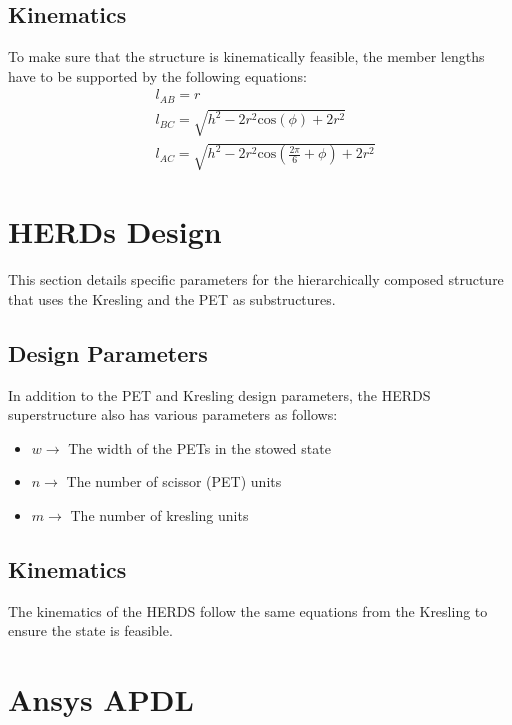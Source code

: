 \documentclass[11pt, a4paper]{article}
\begin{document}
\subsection{Kinematics}
To make sure that the structure is kinematically feasible, the member lengths have to be supported by the following equations:
\begin{align}
    &l_{AB} = r\\
    &l_{BC} = \sqrt{h^2-2r^2\textrm{cos}(\phi)+2r^2} \\
    &l_{AC} = \sqrt{h^2-2r^2\textrm{cos}(\frac{2\pi}{6}+\phi)+2r^2}
\end{align}

\section{HERDs Design}
This section details specific parameters for the hierarchically composed structure that uses the Kresling and the PET as substructures. 
\subsection{Design Parameters}
In addition to the PET and Kresling design parameters, the HERDS superstructure also has various parameters as follows:
\begin{itemize}
    \item $w \rightarrow$ The width of the PETs in the stowed state
    \item $n \rightarrow$ The number of scissor (PET) units
    \item $m \rightarrow$ The number of kresling units
\end{itemize}

\subsection{Kinematics}
The kinematics of the HERDS follow the same equations from the Kresling to ensure the state is feasible. 

\section{Ansys APDL}
\end{document}
